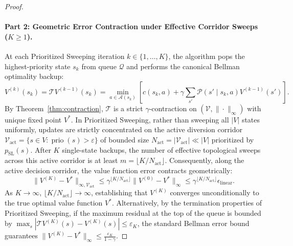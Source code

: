 \documentclass[11pt,a4paper]{article}
\begin{document}
\begin{proof}
\paragraph{Part 2: Geometric Error Contraction under Effective Corridor Sweeps ($K \ge 1$).}
At each Prioritized Sweeping iteration $k \in \{1, \dots, K\}$, the algorithm pops the highest-priority state $s_k$ from queue $\mathcal{Q}$ and performs the canonical Bellman optimality backup:
\begin{equation}
V^{(k)}(s_k) = \mathcal{T} V^{(k-1)}(s_k) = \min_{a \in \mathcal{A}(s_k)} \left[ c(s_k, a) + \gamma \sum_{s'} \mathcal{P}(s' \mid s_k, a) V^{(k-1)}(s') \right].
\end{equation}
By Theorem~\ref{thm:contraction}, $\mathcal{T}$ is a strict $\gamma$-contraction on $(\mathcal{V}, \|\cdot\|_\infty)$ with unique fixed point $V^*$. In Prioritized Sweeping, rather than sweeping all $|V|$ states uniformly, updates are strictly concentrated on the active diversion corridor $\mathcal{V}_{\text{act}} = \{s \in V : \operatorname{prio}(s) > \varepsilon\}$ of bounded size $N_{\text{act}} = |\mathcal{V}_{\text{act}}| \ll |V|$ prioritized by $p_{\text{SL}}(s)$. After $K$ single-state backups, the number of effective topological sweeps across this active corridor is at least $m = \lfloor K / N_{\text{act}} \rfloor$. Consequently, along the active decision corridor, the value function error contracts geometrically:
\begin{equation}
\|V^{(K)} - V^*\|_{\infty, \mathcal{V}_{\text{act}}} \le \gamma^{\lfloor K / N_{\text{act}} \rfloor} \|V^{(0)} - V^*\|_\infty \le \gamma^{\lfloor K / N_{\text{act}} \rfloor} \epsilon_{\text{linear}}.
\end{equation}
As $K \to \infty$, $\lfloor K / N_{\text{act}} \rfloor \to \infty$, establishing that $V^{(K)}$ converges unconditionally to the true optimal value function $V^*$. Alternatively, by the termination properties of Prioritized Sweeping, if the maximum residual at the top of the queue is bounded by $\max_s |\mathcal{T}V^{(K)}(s) - V^{(K)}(s)| \le \varepsilon_K$, the standard Bellman error bound guarantees $\|V^{(K)} - V^*\|_\infty \le \frac{\varepsilon_K}{1 - \gamma}$.


\end{proof}
\end{document}

